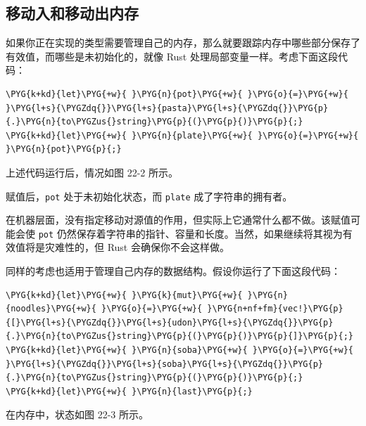 \subsection{移动入和移动出内存}

如果你正在实现的类型需要管理自己的内存，那么就要跟踪内存中哪些部分保存了有效值，而哪些是未初始化的，就像 Rust 处理局部变量一样。考虑下面这段代码：

\begin{Verbatim}[commandchars=\\\{\},breaklines=true,breakanywhere=true,fontsize=\codefont,xleftmargin=17bp]
\PYG{k+kd}{let}\PYG{+w}{ }\PYG{n}{pot}\PYG{+w}{ }\PYG{o}{=}\PYG{+w}{ }\PYG{l+s}{\PYGZdq{}}\PYG{l+s}{pasta}\PYG{l+s}{\PYGZdq{}}\PYG{p}{.}\PYG{n}{to\PYGZus{}string}\PYG{p}{(}\PYG{p}{)}\PYG{p}{;}
\PYG{k+kd}{let}\PYG{+w}{ }\PYG{n}{plate}\PYG{+w}{ }\PYG{o}{=}\PYG{+w}{ }\PYG{n}{pot}\PYG{p}{;}
\end{Verbatim}

上述代码运行后，情况如图 22-2 所示。


赋值后，\texttt{pot} 处于未初始化状态，而 \texttt{plate} 成了字符串的拥有者。

在机器层面，没有指定移动对源值的作用，但实际上它通常什么都不做。该赋值可能会使 \texttt{pot} 仍然保存着字符串的指针、容量和长度。当然，如果继续将其视为有效值将是灾难性的，但 Rust 会确保你不会这样做。

同样的考虑也适用于管理自己内存的数据结构。假设你运行了下面这段代码：

\begin{Verbatim}[commandchars=\\\{\},breaklines=true,breakanywhere=true,fontsize=\codefont,xleftmargin=17bp]
\PYG{k+kd}{let}\PYG{+w}{ }\PYG{k}{mut}\PYG{+w}{ }\PYG{n}{noodles}\PYG{+w}{ }\PYG{o}{=}\PYG{+w}{ }\PYG{n+nf+fm}{vec!}\PYG{p}{[}\PYG{l+s}{\PYGZdq{}}\PYG{l+s}{udon}\PYG{l+s}{\PYGZdq{}}\PYG{p}{.}\PYG{n}{to\PYGZus{}string}\PYG{p}{(}\PYG{p}{)}\PYG{p}{]}\PYG{p}{;}
\PYG{k+kd}{let}\PYG{+w}{ }\PYG{n}{soba}\PYG{+w}{ }\PYG{o}{=}\PYG{+w}{ }\PYG{l+s}{\PYGZdq{}}\PYG{l+s}{soba}\PYG{l+s}{\PYGZdq{}}\PYG{p}{.}\PYG{n}{to\PYGZus{}string}\PYG{p}{(}\PYG{p}{)}\PYG{p}{;}
\PYG{k+kd}{let}\PYG{+w}{ }\PYG{n}{last}\PYG{p}{;}
\end{Verbatim}

在内存中，状态如图 22-3 所示。


